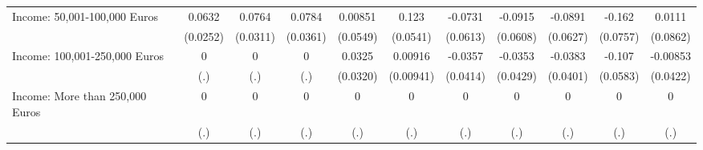 {\begin{tabular}{l*{10}{c}}
Income: 50,001-100,000 Euros&      0.0632\sym{*}  &      0.0764\sym{*}  &      0.0784\sym{*}  &     0.00851         &       0.123\sym{*}  &     -0.0731         &     -0.0915         &     -0.0891         &      -0.162\sym{*}  &      0.0111         \\
            &    (0.0252)         &    (0.0311)         &    (0.0361)         &    (0.0549)         &    (0.0541)         &    (0.0613)         &    (0.0608)         &    (0.0627)         &    (0.0757)         &    (0.0862)         \\
\addlinespace
Income: 100,001-250,000 Euros&           0         &           0         &           0         &      0.0325         &     0.00916         &     -0.0357         &     -0.0353         &     -0.0383         &      -0.107         &    -0.00853         \\
            &         (.)         &         (.)         &         (.)         &    (0.0320)         &   (0.00941)         &    (0.0414)         &    (0.0429)         &    (0.0401)         &    (0.0583)         &    (0.0422)         \\
\addlinespace
Income: More than 250,000 Euros&           0         &           0         &           0         &           0         &           0         &           0         &           0         &           0         &           0         &           0         \\
            &         (.)         &         (.)         &         (.)         &         (.)         &         (.)         &         (.)         &         (.)         &         (.)         &         (.)         &         (.)         \\
\bottomrule
\end{tabular}
}
